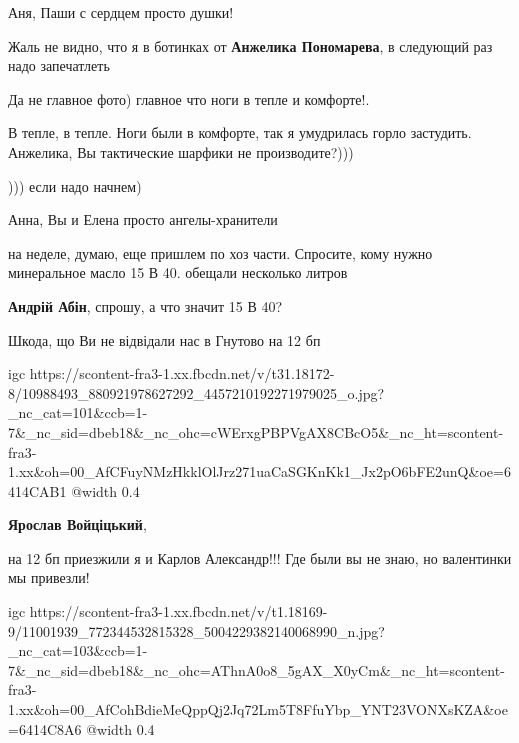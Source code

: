  
 
 
 
 

\qqSecCmt


Аня, Паши с сердцем просто душки!


Жаль не видно, что я в ботинках от \textbf{Анжелика Пономарева}, в следующий раз надо запечатлеть


Да не главное фото) главное что ноги в тепле и комфорте!.


В тепле, в тепле. Ноги были в комфорте, так я умудрилась горло застудить.
Анжелика, Вы тактические шарфики не производите?)))

))) если надо начнем)


Анна, Вы и Елена просто ангелы-хранители


на неделе, думаю, еще пришлем по хоз части. Спросите, кому нужно минеральное
масло 15 В 40. обещали несколько литров

\textbf{Андрій Абін}, спрошу, а что значит 15 В 40?


Шкода, що Ви не відвідали нас в Гнутово на 12 бп

\ifcmt
  igc https://scontent-fra3-1.xx.fbcdn.net/v/t31.18172-8/10988493_880921978627292_4457210192271979025_o.jpg?_nc_cat=101&ccb=1-7&_nc_sid=dbeb18&_nc_ohc=cWErxgPBPVgAX8CBcO5&_nc_ht=scontent-fra3-1.xx&oh=00_AfCFuyNMzHkklOlJrz271uaCaSGKnKk1_Jx2pO6bFE2unQ&oe=6414CAB1
	@width 0.4
\fi

\textbf{Ярослав Войціцький}, 

на 12 бп приезжили я и Карлов Александр!!! Где были вы не знаю, но валентинки
мы привезли!

\ifcmt
  igc https://scontent-fra3-1.xx.fbcdn.net/v/t1.18169-9/11001939_772344532815328_5004229382140068990_n.jpg?_nc_cat=103&ccb=1-7&_nc_sid=dbeb18&_nc_ohc=AThnA0o8_5gAX_X0yCm&_nc_ht=scontent-fra3-1.xx&oh=00_AfCohBdieMeQppQj2Jq72Lm5T8FfuYbp_YNT23VONXsKZA&oe=6414C8A6
	@width 0.4
\fi

